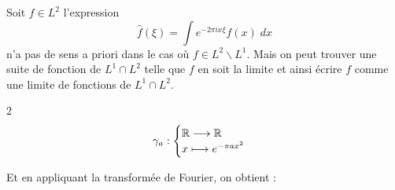 \begin{remark}
    Soit $ f \in L^2$ l'expression $$ \hat{f}(\xi) = \int e^{-2 \pi i x \xi} f(x) \; dx $$ n'a pas de sens a priori dans le cas où $f \in L^2 \backslash L^1$. 
    {Mais} on peut trouver une suite de fonction de $L^1 \cap L^2$ telle que $f$ en soit la limite et ainsi écrire $f$ comme une limite de fonctions de $L^1 \cap L^2$.
\end{remark}

\begin{example}

    \vspace{0.5cm}
    
    \begin{multicols}{2}
        \[ \gamma_a : 
            \begin{cases}
                \mathbb{R} \longrightarrow \mathbb{R} \\ 
                x \longmapsto e^{- \pi a x^2}
            \end{cases}
        \]
    
    \end{multicols}

    Et en appliquant la transformée de Fourier, on obtient :


\end{example}
